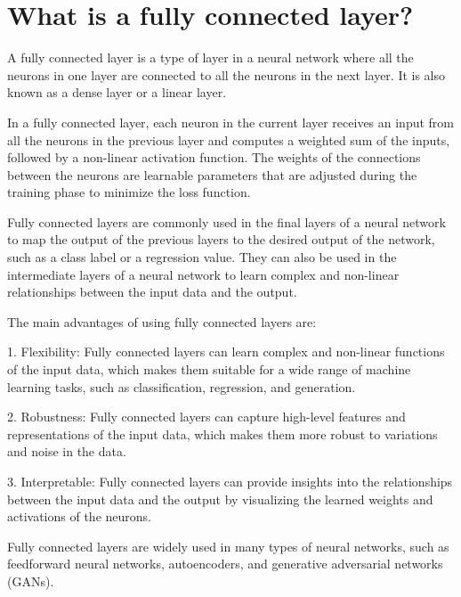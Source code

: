 \section{What is a fully connected layer?}
A fully connected layer is a type of layer in a neural network where all the neurons in one layer are connected to all the neurons in the next layer. It is also known as a dense layer or a linear layer.

In a fully connected layer, each neuron in the current layer receives an input from all the neurons in the previous layer and computes a weighted sum of the inputs, followed by a non-linear activation function. The weights of the connections between the neurons are learnable parameters that are adjusted during the training phase to minimize the loss function.

Fully connected layers are commonly used in the final layers of a neural network to map the output of the previous layers to the desired output of the network, such as a class label or a regression value. They can also be used in the intermediate layers of a neural network to learn complex and non-linear relationships between the input data and the output.

The main advantages of using fully connected layers are:

1. Flexibility: Fully connected layers can learn complex and non-linear functions of the input data, which makes them suitable for a wide range of machine learning tasks, such as classification, regression, and generation.

2. Robustness: Fully connected layers can capture high-level features and representations of the input data, which makes them more robust to variations and noise in the data.

3. Interpretable: Fully connected layers can provide insights into the relationships between the input data and the output by visualizing the learned weights and activations of the neurons.

Fully connected layers are widely used in many types of neural networks, such as feedforward neural networks, autoencoders, and generative adversarial networks (GANs).

